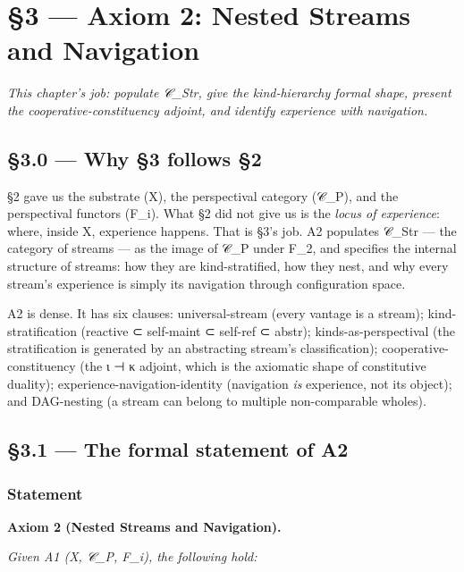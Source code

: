 \documentclass[11pt, openany]{book}
\newcommand{\sectionbreak}{\clearpage}
\begin{document}
\chapter{§3 — Axiom 2: Nested Streams and Navigation}


\textit{This chapter's job: populate 𝒞\_\allowbreak{}Str, give the kind-hierarchy formal shape, present the cooperative-constituency adjoint, and identify experience with navigation.}

\sectionbreak

\section{§3.0 --- Why §3 follows §2}

§2 gave us the substrate (X), the perspectival category (𝒞\_\allowbreak{}P), and the perspectival functors (F\_\allowbreak{}i). What §2 did not give us is the \textit{locus of experience}: where, inside X, experience happens. That is §3's job. A2 populates 𝒞\_\allowbreak{}Str --- the category of streams --- as the image of 𝒞\_\allowbreak{}P under F\_\allowbreak{}2, and specifies the internal structure of streams: how they are kind-stratified, how they nest, and why every stream's experience is simply its navigation through configuration space.

A2 is dense. It has six clauses: universal-stream (every vantage is a stream); kind-stratification (reactive ⊂ self-maint ⊂ self-ref ⊂ abstr); kinds-as-perspectival (the stratification is generated by an abstracting stream's classification); cooperative-constituency (the ι ⊣ κ adjoint, which is the axiomatic shape of constitutive duality); experience-navigation-identity (navigation \textit{is} experience, not its object); and DAG-nesting (a stream can belong to multiple non-comparable wholes).

\sectionbreak

\section{§3.1 --- The formal statement of A2}

\subsection{Statement}

\textbf{Axiom 2 (Nested Streams and Navigation).}

\textit{Given A1 (X, 𝒞\_\allowbreak{}P, F\_\allowbreak{}i), the following hold:}
\end{document}
